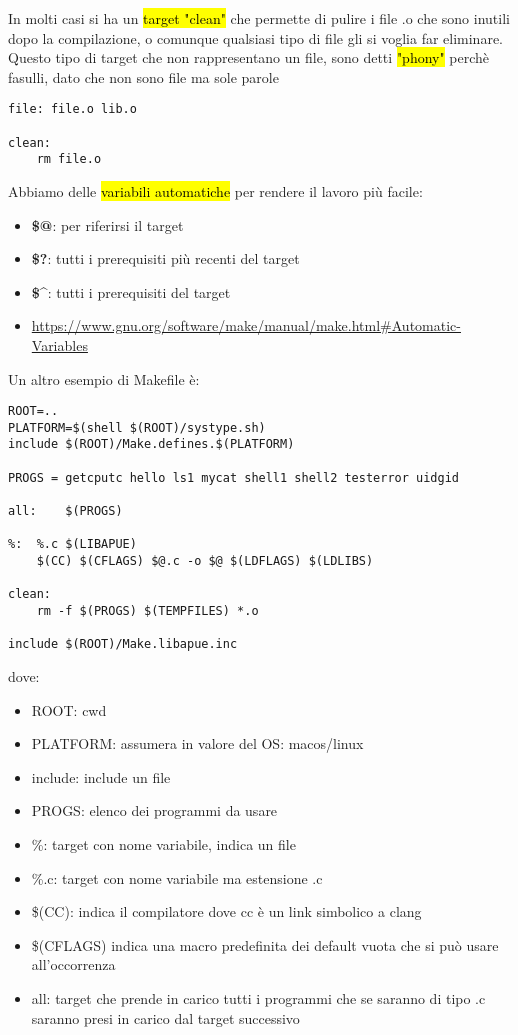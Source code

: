 In molti casi si ha un \hl{target "clean"} che permette di pulire i file .o che sono inutili dopo la compilazione, o comunque qualsiasi tipo di file gli si voglia far eliminare. Questo tipo di target che non rappresentano un file, sono detti \hl{"phony"} perchè fasulli, dato che non sono file ma sole parole

\begin{lstlisting}
file: file.o lib.o

clean:
	rm file.o
\end{lstlisting}

Abbiamo delle \hl{variabili automatiche} per rendere il lavoro più facile:

\begin{itemize}
	\item \textbf{\$@}: per riferirsi il target
	\item \textbf{\$?}: tutti i prerequisiti più recenti del target
	\item \textbf{\$\^}: tutti i prerequisiti del target
	\item \url{https://www.gnu.org/software/make/manual/make.html#Automatic-Variables}
\end{itemize}


Un altro esempio di Makefile è:

\begin{lstlisting}
ROOT=..
PLATFORM=$(shell $(ROOT)/systype.sh)
include $(ROOT)/Make.defines.$(PLATFORM)

PROGS =	getcputc hello ls1 mycat shell1 shell2 testerror uidgid

all:	$(PROGS)

%:	%.c $(LIBAPUE)
	$(CC) $(CFLAGS) $@.c -o $@ $(LDFLAGS) $(LDLIBS)

clean:
	rm -f $(PROGS) $(TEMPFILES) *.o

include $(ROOT)/Make.libapue.inc
\end{lstlisting}

dove:

\begin{itemize}
	\item ROOT: cwd
	\item PLATFORM: assumera in valore del OS: macos/linux
	\item include: include un file
	\item PROGS: elenco dei programmi da usare
	\item \%: target con nome variabile, indica un file
	\item \%.c: target con nome variabile ma estensione .c
	\item \$(CC): indica il compilatore dove cc è un link simbolico a clang
	\item \$(CFLAGS) indica una macro predefinita dei default vuota che si può usare all'occorrenza
	\item all: target che prende in carico tutti i programmi che se saranno di tipo .c saranno presi in carico dal target successivo
\end{itemize}


